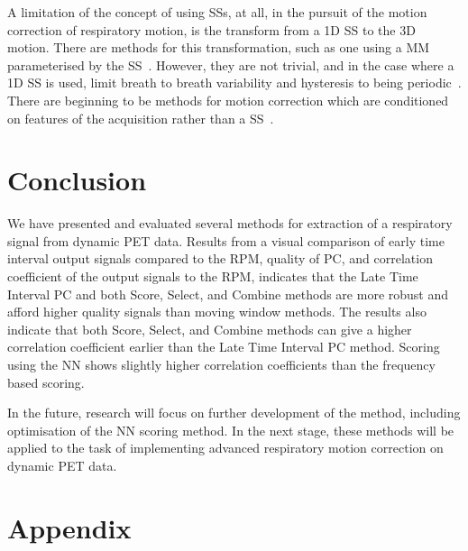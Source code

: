     A limitation of the concept of using \glspl{SS}, at all, in the pursuit of the motion correction of respiratory motion, is the transform from a \gls{1D} \gls{SS} to the \gls{3D} motion. There are methods for this transformation, such as one using a \gls{MM} parameterised by the \gls{SS}~\parencite{McClelland2017, McClelland2013}. However, they are not trivial, and in the case where a \gls{1D} \gls{SS} is used, limit breath to breath variability and hysteresis to being periodic~\parencite{Whitehead2021ComparisonMap}. There are beginning to be methods for motion correction which are conditioned on features of the acquisition rather than a \gls{SS}~\parencite{Huang2023Surrogate-DrivenData, Huang2024Surrogate-drivenData}.
    
\section{Conclusion} \label{sec:conclusion}
    We have presented and evaluated several methods for extraction of a respiratory signal from dynamic \gls{PET} data. Results from a visual comparison of early time interval output signals compared to the \gls{RPM}, quality of \gls{PC}, and correlation coefficient of the output signals to the \gls{RPM}, indicates that the Late Time Interval \gls{PC} and both Score, Select, and Combine methods are more robust and afford higher quality signals than moving window methods. The results also indicate that both Score, Select, and Combine methods can give a higher correlation coefficient earlier than the Late Time Interval \gls{PC} method. Scoring using the \gls{NN} shows slightly higher correlation coefficients than the frequency based scoring.

    In the future, research will focus on further development of the method, including optimisation of the \gls{NN} scoring method. In the next stage, these methods will be applied to the task of implementing advanced respiratory motion correction on dynamic \gls{PET} data.

\section*{Appendix} \label{sec:appendix}
